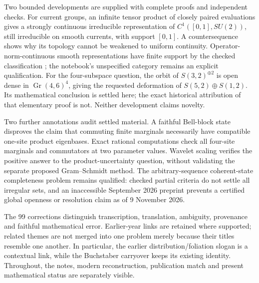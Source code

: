 Two bounded developments are supplied with complete proofs and independent
checks. For current groups, an infinite tensor product of closely paired
evaluations gives a strongly continuous irreducible representation of
$C^1([0,1],SU(2))$, still irreducible on smooth currents, with support
$[0,1]$. A countersequence shows why its topology cannot be weakened to
uniform continuity. Operator-norm-continuous smooth representations have
finite support by the checked classification
\citep{janssensneeb2015norm}; the notebook's unspecified category remains
an explicit qualification. For the four-subspace question, the orbit of
$S(3,2)^{\oplus2}$ is open dense in
$\operatorname{Gr}(4,6)^4$, giving the requested deformation of
$S(5,2)\oplus S(1,2)$. Its mathematical conclusion is settled here;
the exact historical attribution of that elementary proof is not.
Neither development claims novelty.

Two further annotations audit settled material. A faithful Bell-block
state disproves the claim that commuting finite marginals necessarily
have compatible one-site product eigenbases. Exact rational computations
check all four-site marginals and commutators at two parameter values.
Wavelet scaling verifies the positive answer to the product-uncertainty
question, without validating the separate proposed Gram--Schmidt method.
The arbitrary-sequence coherent-state completeness problem remains
qualified: checked partial criteria do not settle all irregular sets,
and an inaccessible September 2026 preprint prevents a certified global
openness or resolution claim as of 9 November 2026.

The 99 corrections distinguish transcription, translation,
ambiguity, provenance and faithful mathematical error. Earlier-year links
are retained where supported; related themes are not merged into one
problem merely because their titles resemble one another. In particular,
the earlier distribution/foliation slogan is a contextual link, while
the Buchstaber carryover keeps its existing identity. Throughout, the
notes, modern reconstruction, publication match and present mathematical
status are separately visible.
